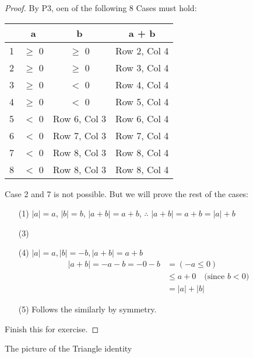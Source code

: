 \documentclass[11pt]{article}
\begin{document}
\begin{proof}
    By P3, oen of the following 8 Cases must hold: \\
    \begin{center}

        \begin{tabular}{|c|c|c|c|}
            \hline
              & a          & b            & a + b        \\ \hline
            1 & \(\geq\) 0 & \(\geq\) 0   & Row 2, Col 4 \\ \hline
            2 & \(\geq\) 0 & \(\geq\) 0   & Row 3, Col 4 \\ \hline
            3 & \(\geq\) 0 & \( < \) 0    & Row 4, Col 4 \\ \hline
            4 & \(\geq\) 0 & \( < \) 0    & Row 5, Col 4 \\ \hline
            5 & \(< \) 0   & Row 6, Col 3 & Row 6, Col 4 \\ \hline
            6 & \(< \) 0   & Row 7, Col 3 & Row 7, Col 4 \\ \hline
            7 & \(< \) 0   & Row 8, Col 3 & Row 8, Col 4 \\ \hline
            8 & \(< \) 0   & Row 8, Col 3 & Row 8, Col 4 \\ \hline
        \end{tabular}
    \end{center}
    Case 2 and 7 is not possible. But we will prove the rest of the cases:
    \begin{itemize}
        \item[(1)] \(|a| = a\), \(|b| = b\), \(|a + b| = a + b\), $\therefore$ \(|a + b| = a + b = |a| + b\)
        \item [(3)]
        \item [(4)] \(|a| = a, |b| = -b, |a + b| = a + b\)
              \begin{align*}
                  |a + b| = - a- b = - 0 - b & = (-a \leq 0)                           \\
                                             & \leq a + 0 \quad \text{(since $b < 0$)} \\
                                             & = |a| + |b|
              \end{align*}
        \item [(5)] Follows the similarly by symmetry.

    \end{itemize}
    Finish this for exercise.
\end{proof}
The picture of the Triangle identity
\end{document}

